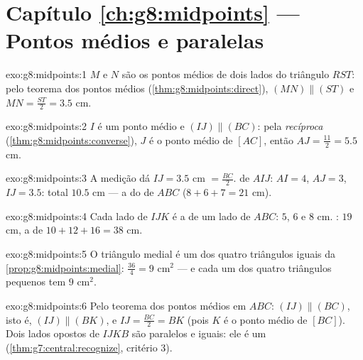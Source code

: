 \section*{Capítulo \ref{ch:g8:midpoints} --- Pontos médios e paralelas}

\begin{solution}{exo:g8:midpoints:1}
$M$ e $N$ são os pontos médios de dois lados do triângulo $RST$: pelo
teorema dos pontos médios (\cref{thm:g8:midpoints:direct}),
$(MN) \parallel (ST)$ e $MN = \frac{ST}{2} = 3.5$ cm.
\end{solution}

\begin{solution}{exo:g8:midpoints:2}
$I$ é um ponto médio e $(IJ) \parallel (BC)$: pela \emph{recíproca}
(\cref{thm:g8:midpoints:converse}), $J$ é o ponto médio de $[AC]$,
então $AJ = \frac{11}{2} = 5.5$ cm.
\end{solution}

\begin{solution}{exo:g8:midpoints:3}
A medição dá $IJ = 3.5$ cm $= \frac{BC}{2}$.  de $AIJ$:
$AI = 4$, $AJ = 3$, $IJ = 3.5$: total $10.5$ cm --- a  do
 de $ABC$ ($8 + 6 + 7 = 21$ cm).
\end{solution}

\begin{solution}{exo:g8:midpoints:4}
Cada lado de $IJK$ é a  de um lado de $ABC$: $5$, $6$ e $8$ cm.
: $19$ cm, a  de $10 + 12 + 16 = 38$ cm.
\end{solution}

\begin{solution}{exo:g8:midpoints:5}
O triângulo medial é um dos quatro triângulos iguais da
\cref{prop:g8:midpoints:medial}:  $\frac{36}{4} = 9$ cm$^2$ --- e
cada um dos quatro triângulos pequenos tem  $9$ cm$^2$.
\end{solution}

\begin{solution}{exo:g8:midpoints:6}
Pelo teorema dos pontos médios em $ABC$: $(IJ) \parallel (BC)$, isto
é, $(IJ) \parallel (BK)$, e $IJ = \frac{BC}{2} = BK$ (pois $K$ é o
ponto médio de $[BC]$). Dois lados opostos de $IJKB$ são paralelos e
iguais: ele é um 
(\cref{thm:g7:central:recognize}, critério 3).
\end{solution}

